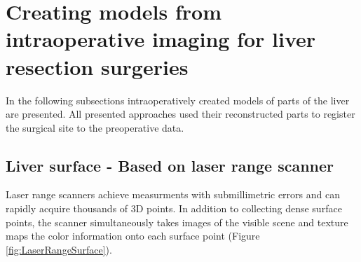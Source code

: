 
\section{Creating models from intraoperative imaging for liver resection
  surgeries}
In the following subsections intraoperatively created models of parts of the
liver are presented. All presented approaches used their reconstructed parts to
register the surgical site to the preoperative data.


\subsection{Liver surface - Based on laser range scanner}
Laser range scanners achieve measurments with submillimetric errors and can rapidly
acquire thousands of 3D points. In addition to collecting dense surface points,
the scanner simultaneously takes images of the visible scene and texture maps
the color information onto each surface point (Figure \ref{fig:LaserRangeSurface}). 

